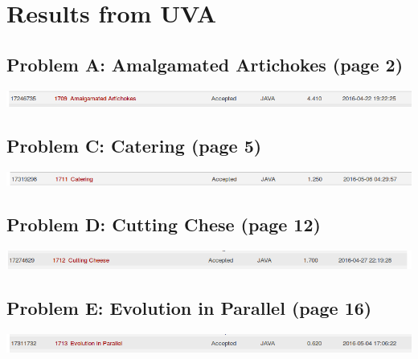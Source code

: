 \documentclass[12pt]{article}
\begin{document}

\newcommand{\hmwkClass}{COS 255}
\newcommand{\hmwkSemester}{Spring 2016}

\newcommand{\hmwkAuthorName}{Lukas Leung}
\newcommand{\hmwkAuthorID}{lleung}

\newcommand{\hmwkAssignmentNum}{9}

\newcommand{\hmwkProblemNum}{1}

\newcommand{\hmwkCollaborators}{none}
\thispagestyle{fancycollab}

\section*{Results from UVA}
\subsection{Problem A: Amalgamated Artichokes (page 2)}
\includegraphics[width=\textwidth]{ProblemA}
\subsection{Problem C: Catering (page 5)}
\includegraphics[width=\textwidth]{ProblemC}
\subsection{Problem D: Cutting Chese (page 12)}
\includegraphics[width=\textwidth]{ProblemD}
\subsection{Problem E: Evolution in Parallel (page 16)}
\includegraphics[width=\textwidth]{ProblemE}
\end{document}
